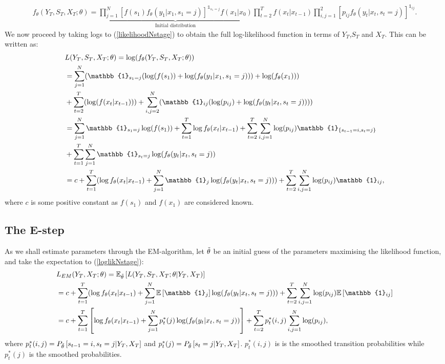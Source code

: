 \documentclass[11pt,a4paper,oneside]{article}
\newcommand{\rb}{\right]}
\newcommand{\lb}{\left[}
\begin{document}
\begin{align}\label{likelihoodNstage}
    f_\theta(Y_T,S_T,X_T;\theta)=\underbrace{\prod_{j=1}^{N}\lb f(s_1)f_\theta(y_1\vert x_1,s_1=j) \rb^{\mathbb{1}_{s_1=j}}f(x_1\vert x_0)}_{\text{Initial distribution}}\prod_{t=2}^{T}f(x_t\vert x_{t-1})\prod_{i,j=1}^{2}\lb p_{ij}f_\theta(y_t\vert x_t,s_t=j) \rb^{\mathbb{1}_{ij}}.
\end{align}
We now proceed by taking logs to (\ref{likelihoodNstage}) to obtain the full log-likelihood function in terms of $Y_T$,$S_T$ and $X_T$. This can be written as:
\begin{align}\label{loglikNstage}
    &L(Y_T,S_T,X_T;\theta)=\log(f_\theta(Y_T,S_T,X_T;\theta)) \notag \\
    &=\sum_{j=1}^{N}( \mathbb{1}_{s_1=j}(\log(f(s_1))+\log(f_\theta(y_1\vert x_1,s_1=j)))+\log(f_\theta(x_1))) \notag \\ 
    &+\sum_{t=2}^{T}(\log(f(x_t\vert x_{t-1})))+\sum_{i,j=2}^{N}(\mathbb{1}_{ij}(\log(p_{ij})+\log(f_\theta(y_t\vert x_t,s_t=j)))) \notag \\
    &= \sum_{j=1}^{N}\mathbb{1}_{s_1=j}\log(f(s_1))+\sum_{t=1}^{T}\log f_\theta(x_t\vert x_{t-1})+\sum_{t=2}^{T}\sum_{i,j=1}^{N}\log(p_{ij})\mathbb{1}_{\{s_{t-1}=i,s_t=j\}} \notag \\
    &+\sum_{t=1}^{T}\sum_{j=1}^{N}\mathbb{1}_{s_t=j}\log(f_\theta(y_t\vert x_t,s_t=j)) \notag \\
    &=c+\sum_{t=1}^{T}(\log f_\theta(x_t\vert x_{t-1})+\sum_{j=1}^{N}\mathbb{1}_j\log(f_\theta(y_t\vert x_t,s_t=j)))+\sum_{t=2}^{T}\sum_{i,j=1}^{N}\log(p_{ij})\mathbb{1}_{ij},
\end{align}
where $c$ is some positive constant as $f(s_1)$ and $f(x_1)$ are considered known.

\subsection{The E-step}
\noindent As we shall estimate parameters through the EM-algorithm, let $\Tilde{\theta}$ be an initial guess of the parameters maximising the likelihood function, and take the expectation to (\ref{loglikNstage}): \begin{align}\label{Lem}
   &L_{EM}(Y_T,X_T;\theta) = \mathbb{E}_{\Tilde{\theta}} \lb L(Y_T,S_T,X_T;\theta \vert Y_T,X_T) \rb \notag \\
   &=c+\sum_{t=1}^{T}(\log f_\theta(x_t\vert x_{t-1})+\sum_{j=1}^{N}\mathbb{E}\lb \mathbb{1}_j \rb\log(f_\theta(y_t\vert x_t,s_t=j)))+\sum_{t=2}^{T}\sum_{i,j=1}^{N}\log(p_{ij})\mathbb{E}\lb\mathbb{1}_{ij}\rb \notag \\
   &= c+\sum_{t=1}^{T}\lb \log f_\theta(x_t\vert x_{t-1})+\sum_{j=1}^{N}p_t^*(j)  \log(f_\theta(y_t\vert x_t,s_t=j))\rb+\sum_{t=2}^{T}p_t^*(i,j)\sum_{i,j=1}^{N}\log(p_{ij}),
\end{align}
where $p_t^*(i,j)=P_{\Tilde{\theta}}\lb s_{t-1}=i,s_t=j\vert Y_T,X_T \rb$ and $p_t^*(j)=P_{\Tilde{\theta}}\lb s_t=j\vert Y_T,X_T \rb$. $p_t^*(i,j)$ is is the smoothed transition probabilities while $p_t^*(j)$ is the smoothed probabilities.
 
\end{document}
